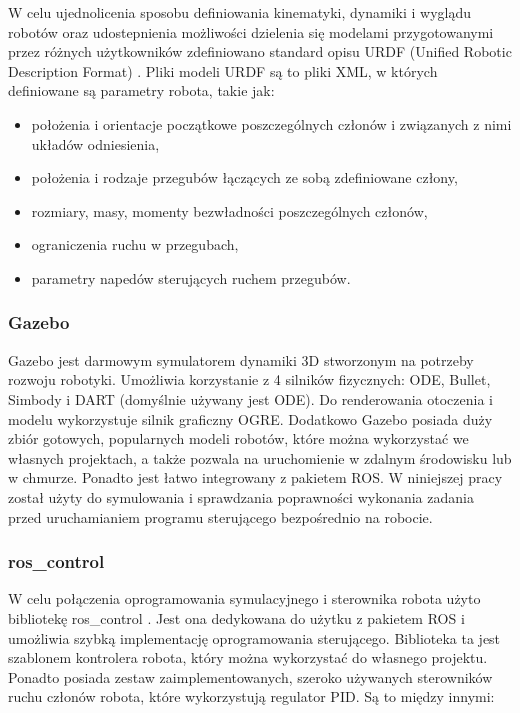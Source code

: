 \documentclass[a4paper, 12pt, twoside]{article}
\begin{document}
W celu ujednolicenia sposobu definiowania kinematyki, dynamiki i wyglądu robotów oraz udostepnienia możliwości dzielenia się modelami przygotowanymi przez różnych użytkowników zdefiniowano standard opisu URDF (Unified Robotic Description Format) \cite{urdf}. Pliki modeli URDF są to pliki XML, w których definiowane są parametry robota, takie jak:
\begin{itemize}
\item położenia i orientacje początkowe poszczególnych członów i związanych z nimi układów odniesienia,
\item położenia i rodzaje przegubów łączących ze sobą zdefiniowane człony,
\item rozmiary, masy, momenty bezwładności poszczególnych członów,
\item ograniczenia ruchu w przegubach,
\item parametry napedów sterujących ruchem przegubów.
\end{itemize}

\subsubsection{Gazebo}

Gazebo jest darmowym symulatorem dynamiki 3D stworzonym na potrzeby rozwoju robotyki. Umożliwia korzystanie z 4 silników fizycznych: ODE, Bullet, Simbody i DART (domyślnie używany jest ODE). Do renderowania otoczenia i modelu wykorzystuje silnik graficzny OGRE. Dodatkowo Gazebo posiada duży zbiór gotowych, popularnych modeli robotów, które można wykorzystać we własnych projektach, a także pozwala na uruchomienie w zdalnym środowisku lub w chmurze. Ponadto jest łatwo integrowany z pakietem ROS. W niniejszej pracy został użyty do symulowania i sprawdzania poprawności wykonania zadania przed uruchamianiem programu sterującego bezpośrednio na robocie.

\subsubsection{ros\_control}

W celu połączenia oprogramowania symulacyjnego i sterownika robota użyto bibliotekę ros\_control \cite{roscontrol} \cite{roscontrolart}. Jest ona dedykowana do użytku z pakietem ROS i umożliwia szybką implementację oprogramowania sterującego. Biblioteka ta jest szablonem kontrolera robota, który można wykorzystać do własnego projektu. Ponadto posiada zestaw zaimplementowanych, szeroko używanych sterowników ruchu członów robota, które wykorzystują regulator PID. Są to między innymi:
\end{document}
